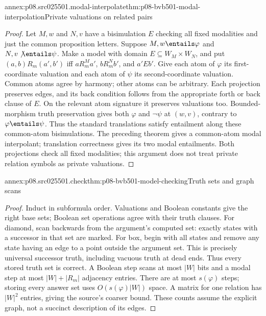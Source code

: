\begin{annexitem}{annex:p08.src025501.modal-interpolate}{thm:p08-bvb501-modal-interpolation}{Private valuations on related pairs}
\begin{proof}
Let \(M,w\) and \(N,v\) have a bisimulation \(E\) checking
all fixed modalities and just the common proposition letters. Suppose
\(M,w\entails\varphi\) and \(N,v\not\entails\psi\).
Make a model with domain \(E\subseteq W_M\times W_N\), and
put \((a,b)R_m(a',b')\) iff \(aR_m^Ma'\),
\(bR_m^Nb'\), and \(a'Eb'\). Give each atom of
\(\varphi\) its first-coordinate valuation and each atom of
\(\psi\) its second-coordinate valuation. Common atoms agree
by harmony; other atoms can be arbitrary. Each projection preserves
edges, and its back condition follows from the appropriate forth or
back clause of \(E\). On the relevant atom signature it preserves
valuations too. Bounded-morphism truth preservation gives both
\(\varphi\) and \(\neg\psi\) at \((w,v)\), contrary
to \(\varphi\entails\psi\). Thus the standard translations
satisfy entailment along these common-atom bisimulations. The preceding
theorem gives a common-atom modal interpolant; translation correctness
gives its two modal entailments. Both projections check all fixed
modalities; this argument does not treat private relation symbols as
private valuations.
\end{proof}
\end{annexitem}

\begin{annexitem}{annex:p08.src025501.check}{thm:p08-bvb501-model-checking}{Truth sets and graph scans}
\begin{proof}
Induct in subformula order. Valuations and Boolean constants give the
right base sets; Boolean set operations agree with their truth clauses.
For diamond, scan backwards from the argument's computed set: exactly
states with a successor in that set are marked. For box, begin with all
states and remove any state having an edge to a point outside the
argument set. This is precisely universal successor truth, including
vacuous truth at dead ends. Thus every stored truth set is correct.
A Boolean step scans at most \(|W|\) bits and a modal step at most
\(|W|+|R_m|\) adjacency entries. There are at most
\(s(\varphi)\) steps; storing every answer set uses
\(O(s(\varphi)|W|)\) space. A matrix for one relation has
\(|W|^2\) entries, giving the source's coarser bound. These
counts assume the explicit graph, not a succinct description of its edges.
\end{proof}
\end{annexitem}

